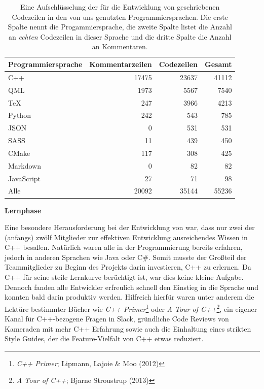 \pagebreak

\begin{table}
  \centering
  \begin{tabular}{lrrr}
    \textbf{Programmiersprache} & \textbf{Kommentarzeilen} & \textbf{Codezeilen} & \textbf{Gesamt} \\
    \midrule
    C++ & 17475 & 23637 & 41112 \\
    QML & 1973 & 5567 & 7540 \\
    TeX & 247 & 3966 & 4213 \\
    Python & 242 & 543 & 785 \\
    JSON & 0 & 531 & 531 \\
    SASS & 11 & 439 & 450 \\
    CMake & 117 & 308 & 425 \\
    Markdown & 0 & 82 & 82 \\
    JavaScript & 27 & 71 & 98 \\
    \bottomrule
    Alle & 20092 & 35144 & 55236
  \end{tabular}
  \caption{Eine Aufschlüsselung der für die Entwicklung von \erasim{} geschriebenen Codezeilen in den von uns genutzten Programmiersprachen. Die erste Spalte nennt die Progammiersprache, die zweite Spalte listet die Anzahl an \emph{echten} Codezeilen in dieser Sprache und die dritte Spalte die Anzahl an Kommentaren.}
  \label{tbl:lang}
\end{table}

\textbf{Lernphase}

Eine besondere Herausforderung bei der Entwicklung von \erasim{} war, dass nur
zwei der (anfangs) zwölf Mitglieder zur effektiven Entwicklung ausreichendes
Wissen in C++ besaßen. Natürlich waren alle in der Programmierung bereits
erfahren, jedoch in anderen Sprachen wie Java oder C\#. Somit musste
der Großteil der Teammitglieder zu Beginn des Projekts darin investieren, C++ zu
erlernen. Da C++ für seine steile Lernkurve berüchtigt ist, war dies keine
kleine Aufgabe. Dennoch fanden alle Entwickler erfreulich schnell den Einstieg
in die Sprache und konnten bald darin produktiv werden. Hilfreich hierfür waren
unter anderem die Lektüre bestimmter Bücher wie \emph{C++
Primer}\footnote{\emph{C++ Primer}; Lipmann, Lajoie \& Moo (2012)} oder \emph{A
Tour of C++}\footnote{\emph{A Tour of C++}; Bjarne Stroustrup (2013)}, ein
eigener Kanal für C++-bezogene Fragen in Slack, gründliche Code Reviews
von Kameraden mit mehr C++ Erfahrung sowie auch die Einhaltung eines
strikten Style Guides, der die Feature-Vielfalt von C++ etwas reduziert.

